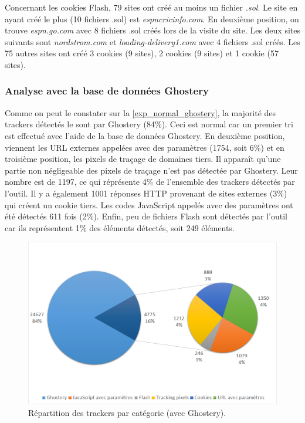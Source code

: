 Concernant les cookies Flash, 79 sites ont créé au moins un fichier \textit{.sol}. Le site en ayant créé le plus (10 fichiers .sol) est \textit{espncricinfo.com}. En deuxième position, on trouve \textit{espn.go.com} avec 8 fichiers .sol créés lors de la visite du site. Les deux sites suivants sont \textit{nordstrom.com} et \textit{loading-delivery1.com} avec 4 fichiers .sol créés. Les 75 autres sites ont créé 3 cookies (9 sites), 2 cookies (9 sites) et 1 cookie (57 sites).

\subsubsection{Analyse avec la base de données Ghostery}
Comme on peut le constater sur la \autoref{exp_normal_ghostery}, la majorité des trackers détectés le sont par Ghostery (84\%). Ceci est normal car un premier tri est effectué avec l'aide de la base de données Ghostery. En deuxième position, viennent les URL externes appelées avec des paramètres (1754, soit 6\%) et en troisième position, les pixels de traçage de domaines tiers. Il apparaît qu'une partie non négligeable des pixels de traçage n'est pas détectée par Ghostery. Leur nombre est de 1197, ce qui réprésente 4\% de l'ensemble des trackers détectés par l'outil. Il y a également 1001 réponses HTTP provenant de sites externes (3\%) qui créent un cookie tiers. Les codes JavaScript appelés avec des paramètres ont été détectés 611 fois (2\%). Enfin, peu de fichiers Flash sont détectés par l'outil car ils représentent 1\% des éléments détectés, soit 249 éléments.

\begin{figure}[!h]
	\centering
	\includegraphics[scale=.56]{resultats/ANALYSES/Images/Normal-Ghostery.png}
	\caption{\label{exp_normal_ghostery}Répartition des trackers par catégorie (avec Ghostery).}
\end{figure}

